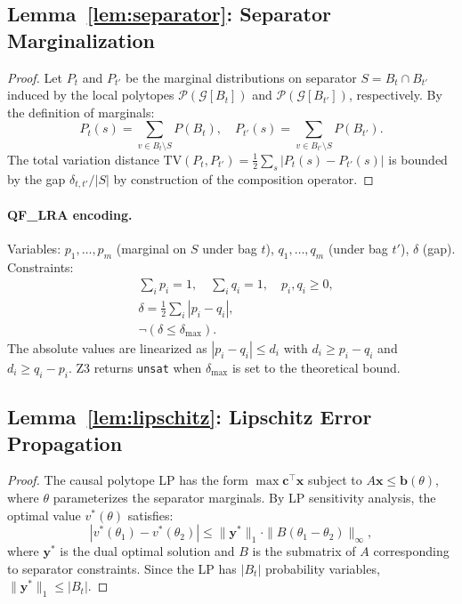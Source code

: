 \documentclass[11pt,a4paper]{article}
\newcommand{\calG}{\mathcal{G}}
\newcommand{\calP}{\mathcal{P}}
\newcommand{\TV}{\mathrm{TV}}
\begin{document}
\subsection{Lemma~\ref{lem:separator}: Separator Marginalization}

\begin{proof}
Let $P_t$ and $P_{t'}$ be the marginal distributions on separator $S = B_t \cap B_{t'}$ induced by the local polytopes $\calP(\calG[B_t])$ and $\calP(\calG[B_{t'}])$, respectively. By the definition of marginals:
\begin{equation}
P_t(s) = \sum_{v \in B_t \setminus S} P(B_t), \quad P_{t'}(s) = \sum_{v \in B_{t'} \setminus S} P(B_{t'}).
\end{equation}
The total variation distance $\TV(P_t, P_{t'}) = \frac{1}{2}\sum_s |P_t(s) - P_{t'}(s)|$ is bounded by the gap $\delta_{t,t'}/|S|$ by construction of the composition operator.
\end{proof}

\paragraph{QF\_LRA encoding.} Variables: $p_1, \ldots, p_m$ (marginal on $S$ under bag $t$), $q_1, \ldots, q_m$ (under bag $t'$), $\delta$ (gap). Constraints:
\begin{align}
&\sum_i p_i = 1, \quad \sum_i q_i = 1, \quad p_i, q_i \geq 0, \\
&\delta = \frac{1}{2} \sum_i |p_i - q_i|, \\
&\neg(\delta \leq \delta_{\max}).
\end{align}
The absolute values are linearized as $|p_i - q_i| \leq d_i$ with $d_i \geq p_i - q_i$ and $d_i \geq q_i - p_i$. Z3 returns \texttt{unsat} when $\delta_{\max}$ is set to the theoretical bound.

\subsection{Lemma~\ref{lem:lipschitz}: Lipschitz Error Propagation}

\begin{proof}
The causal polytope LP has the form $\max \mathbf{c}^\top \mathbf{x}$ subject to $A\mathbf{x} \leq \mathbf{b}(\theta)$, where $\theta$ parameterizes the separator marginals. By LP sensitivity analysis, the optimal value $v^*(\theta)$ satisfies:
\begin{equation}
|v^*(\theta_1) - v^*(\theta_2)| \leq \|\mathbf{y}^*\|_1 \cdot \|B(\theta_1 - \theta_2)\|_\infty,
\end{equation}
where $\mathbf{y}^*$ is the dual optimal solution and $B$ is the submatrix of $A$ corresponding to separator constraints. Since the LP has $|B_t|$ probability variables, $\|\mathbf{y}^*\|_1 \leq |B_t|$.
\end{proof}
\end{document}
